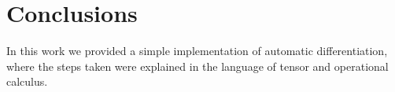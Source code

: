 \section{Conclusions}

In this work we provided a simple implementation of automatic differentiation, where the steps taken were explained in the language of tensor and operational calculus. 
